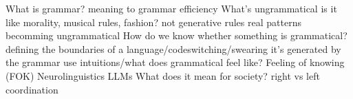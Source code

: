 What is grammar?
    meaning to grammar
    efficiency
    What's ungrammatical
    is it like morality, musical rules, fashion?
    not generative rules
    real patterns
    becomming ungrammatical
How do we know whether something is grammatical?
    defining the boundaries of a language/codeswitching/swearing
    it's generated by the grammar
    use intuitions/what does grammatical feel like? Feeling of knowing (FOK)
    Neurolinguistics
    LLMs
What does it mean for society?
    right vs left
    coordination